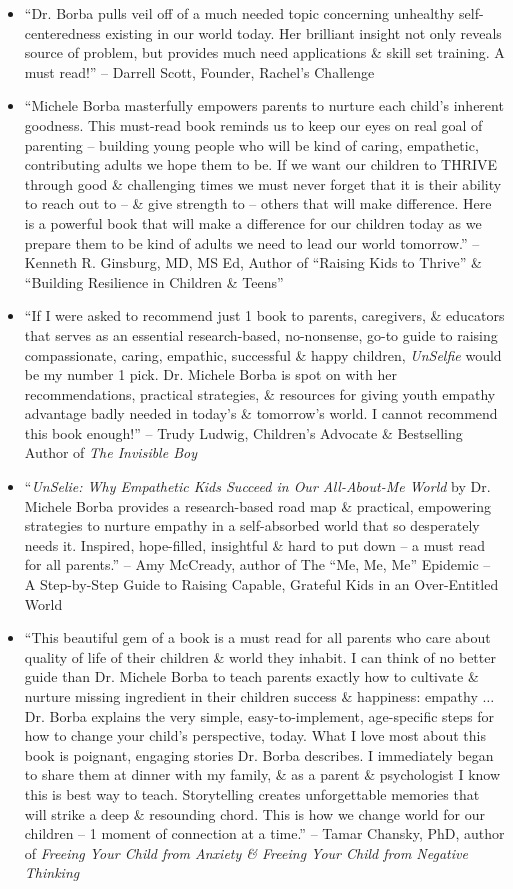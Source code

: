 \documentclass{article}
\begin{document}
\begin{enumerate}
\begin{itemize}
		\item ``Dr. {\sc Borba} pulls veil off of a much needed topic concerning unhealthy self-centeredness existing in our world today. Her brilliant insight not only reveals source of problem, but provides much need applications \& skill set training. A must read!'' -- {\sc Darrell Scott}, Founder, Rachel's Challenge
		\item ``{\sc Michele Borba} masterfully empowers parents to nurture each child's inherent goodness. This must-read book reminds us to keep our eyes on real goal of parenting -- building young people who will be kind of caring, empathetic, contributing adults we hope them to be. If we want our children to THRIVE through good \& challenging times we must never forget that it is their ability to reach out to -- \& give strength to -- others that will make difference. Here is a powerful book that will make a difference for our children today as we prepare them to be kind of adults we need to lead our world tomorrow.'' -- {\sc Kenneth R. Ginsburg}, MD, MS Ed, Author of ``Raising Kids to Thrive'' \& ``Building Resilience in Children \& Teens''
		\item ``If I were asked to recommend just 1 book to parents, caregivers, \& educators that serves as an essential research-based, no-nonsense, go-to guide to raising compassionate, caring, empathic, successful \& happy children, {\it UnSelfie} would be my number 1 pick. Dr. {\sc Michele Borba} is spot on with her recommendations, practical strategies, \& resources for giving youth empathy advantage badly needed in today's \& tomorrow's world. I cannot recommend this book enough!'' -- {\sc Trudy Ludwig}, Children's Advocate \& Bestselling Author of {\it The Invisible Boy}
		\item ``{\it UnSelie: Why Empathetic Kids Succeed in Our All-About-Me World} by Dr. {\sc Michele Borba} provides a research-based road map \& practical, empowering strategies to nurture empathy in a self-absorbed world that so desperately needs it. Inspired, hope-filled, insightful \& hard to put down -- a must read for all parents.'' -- {\sc Amy McCready}, author of The ``Me, Me, Me'' Epidemic -- A Step-by-Step Guide to Raising Capable, Grateful Kids in an Over-Entitled World
		\item ``This beautiful gem of a book is a must read for all parents who care about quality of life of their children \& world they inhabit. I can think of no better guide than Dr. {\sc Michele Borba} to teach parents exactly how to cultivate \& nurture missing ingredient in their children success \& happiness: empathy $\ldots$ Dr. {\sc Borba} explains the very simple, easy-to-implement, age-specific steps for how to change your child's perspective, today. What I love most about this book is poignant, engaging stories Dr. {\sc Borba} describes. I immediately began to share them at dinner with my family, \& as a parent \& psychologist I know this is best way to teach. Storytelling creates unforgettable memories that will strike a deep \& resounding chord. This is how we change world for our children -- 1 moment of connection at a time.'' -- {\sc Tamar Chansky}, PhD, author of {\it Freeing Your Child from Anxiety \& Freeing Your Child from Negative Thinking}

\end{itemize}
\end{enumerate}
\end{document}
